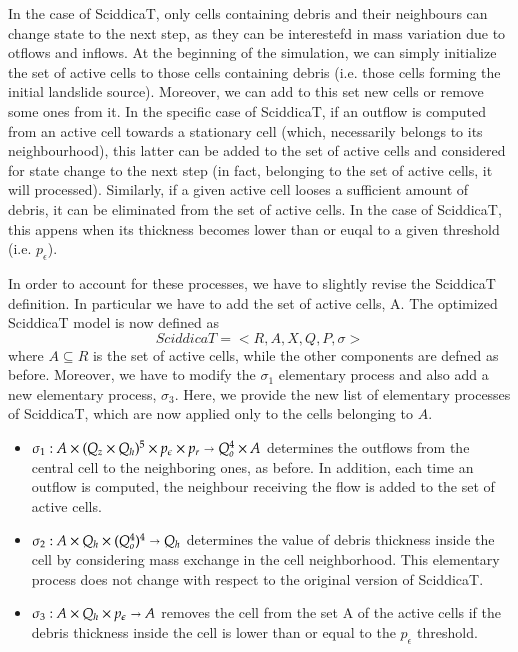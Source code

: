 In the case of SciddicaT, only cells containing debris and their
neighbours can change state to the next step, as they can be
interestefd in mass variation due to otflows and inflows. At the
beginning of the simulation, we can simply initialize the set of
active cells to those cells containing debris (i.e. those cells
forming the initial landslide source). Moreover, we can add to this
set new cells or remove some ones from it. In the specific case of
SciddicaT, if an outflow is computed from an active cell towards a
stationary cell (which, necessarily belongs to its neighbourhood),
this latter can be added to the set of active cells and considered for
state change to the next step (in fact, belonging to the set of active
cells, it will processed). Similarly, if a given active cell looses a
sufficient amount of debris, it can be eliminated from the set of
active cells. In the case of SciddicaT, this appens when its thickness
becomes lower than or euqal to a given threshold (i.e. $p_\epsilon$).

In order to account for these processes, we have to slightly revise
the SciddicaT definition. In particular we have to add the set of
active cells, A. The optimized SciddicaT model is now defined as
$$SciddicaT = < R, A, X, Q , P, \sigma >$$ where $A \subseteq R$ is
the set of active cells, while the other components are defned as
before. Moreover, we have to modify the $\sigma_1$ elementary process
and also add a new elementary process, $\sigma_3$. Here, we provide
the new list of elementary processes of SciddicaT, which are now
applied only to the cells belonging to $A$.

\begin{itemize}
\item $\sigma_1 : A \times (Q_z \times Q_h)^5 \times p_\epsilon \times p_r
  \shortrightarrow Q_o^4 \times A$ determines the outflows from the
  central cell to the neighboring ones, as before. In addition, each
  time an outflow is computed, the neighbour receiving the flow is
  added to the set of active cells.

\item $\sigma_2: A \times Q_h \times (Q_o^4)^4 \shortrightarrow Q_h$ determines
  the value of debris thickness inside the cell by considering mass
  exchange in the cell neighborhood. This elementary process does not
  change with respect to the original version of SciddicaT.

\item $\sigma_3: A \times Q_h \times p_\epsilon \shortrightarrow A$ removes the
  cell from the set A of the active cells if the debris thickness
  inside the cell is lower than or equal to the $p_\epsilon$
  threshold.
\end{itemize}


